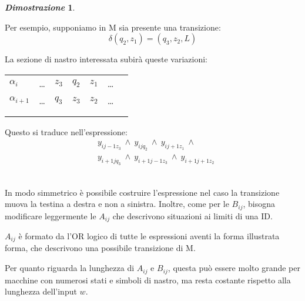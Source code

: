 \documentclass[12pt]{article}
\theoremstyle{definition}
\newtheorem*{myproof}{\em Dimostrazione}
\begin{document}
\begin{myproof}
\begin{description}
    Per esempio, supponiamo in M sia presente una transizione: \[
    \delta(q_2,z_1) = (q_3, z_2, L)
    \] \newline
    
    La sezione di nastro interessata subir\`a queste variazioni:
    \begin{table}[!ht]
      \centering
      \begin{tabular}{lllllll}
        \cline{2-6}
        \multicolumn{1}{l}{\(\alpha_i\)} & \multicolumn{1}{|l|}{\ldots} & \multicolumn{1}{l|}{\(z_3\)} & \multicolumn{1}{l|}{\(q_2\)} & \multicolumn{1}{l|}{\(z_1\)} & \multicolumn{1}{l|}{\ldots} &  \\ \cline{2-6}
        \multicolumn{1}{l}{\(\alpha_{i+1}\)} & \multicolumn{1}{|l|}{\ldots} & \multicolumn{1}{l|}{\(q_3\)} & \multicolumn{1}{l|}{\(z_3\)} & \multicolumn{1}{l|}{\(z_2\)} & \multicolumn{1}{l|}{\ldots} &  \\ \cline{2-6}
        &                       &                       &                       &                       &  \\
        &                       &                       &                       &                       &
      \end{tabular}
    \end{table}


    Questo si traduce nell'espressione:\[
    \begin{aligned}
      &y_{ij-1z_3}\ \land\ y_{ijq_2}\ \land\ y_{ij+1z_1}\ \land \\
      &y_{i+1jq_3}\ \land\ y_{i+1j-1z_3}\ \land\ y_{i+1j+1z_2}
    \end{aligned}
    \]\ \newline

    In modo simmetrico \`e possibile costruire l'espressione nel caso la transizione
    muova la testina a destra e non a sinistra. Inoltre, come per le \(B_{ij}\),
    bisogna modificare leggermente le \(A_{ij}\) che descrivono situazioni ai limiti di una ID. \newline

    \(A_{ij}\) \`e formato da l'OR logico di tutte le espressioni aventi la forma illustrata forma,
    che descrivono una possibile transizione di M. \newline

    Per quanto riguarda la lunghezza di \(A_{ij}\) e \(B_{ij}\), questa pu\`o essere molto
    grande per macchine con numerosi stati e simboli di nastro, ma resta costante rispetto alla
    lunghezza dell'input \(w\).\newline


\end{description}
\end{myproof}
\end{document}

